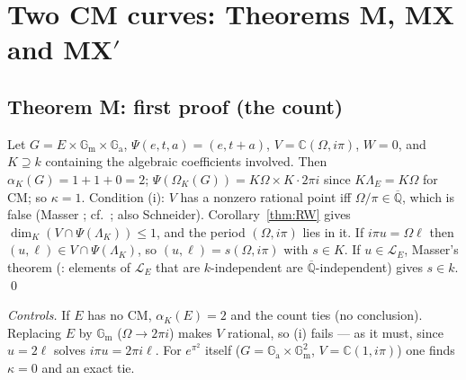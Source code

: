 \documentclass[11pt]{amsart}
\theoremstyle{definition}
\newcommand{\Qb}{\overline{\mathbb{Q}}}
\newcommand{\C}{\mathbb{C}}
\newcommand{\Ga}{\mathbb{G}_{\mathrm a}}
\newcommand{\Gm}{\mathbb{G}_{\mathrm m}}
\newcommand{\Lg}{\mathcal{L}}
\begin{document}
\section{Two CM curves: Theorems M, MX and MX$'$}\label{sec:two}

\subsection{Theorem M: first proof (the count)}\label{sec:M}
Let $G=E\times\Gm\times\Ga$, $\Psi(e,t,a)=(e,t+a)$, $V=\C(\Omega,i\pi)$, $W=0$, and $K\supseteq k$ containing the
algebraic coefficients involved. Then $\alpha_K(G)=1+1+0=2$; $\Psi(\Omega_K(G))=K\Omega\times K\cdot2\pi i$ since
$K\Lambda_E=K\Omega$ for CM; so $\kappa=1$. Condition (i): $V$ has a nonzero rational point iff $\Omega/\pi\in\Qb$, which is
false (Masser \cite{Ma75}; cf.\ \cite[Thm.~26]{W06}; also Schneider). Corollary~\ref{thm:RW} gives
$\dim_K(V\cap\Psi(\Lambda_K))\le1$, and the period $(\Omega,i\pi)$ lies in it. If $i\pi u=\Omega\ell$ then
$(u,\ell)\in V\cap\Psi(\Lambda_K)$, so $(u,\ell)=s(\Omega,i\pi)$ with $s\in K$. If $u\in\Lg_E$, Masser's theorem
(\cite[Thm.~27]{W06}: elements of $\Lg_E$ that are $k$-independent are $\Qb$-independent) gives $s\in k$. \qed

\smallskip\noindent\emph{Controls.} If $E$ has no CM, $\alpha_K(E)=2$ and the count ties (no conclusion). Replacing $E$ by
$\Gm$ ($\Omega\to2\pi i$) makes $V$ rational, so (i) fails --- as it must, since $u=2\ell$ solves $i\pi u=2\pi i\ell$. For
$e^{\pi^2}$ itself ($G=\Ga\times\Gm^2$, $V=\C(1,i\pi)$) one finds $\kappa=0$ and an exact tie.
\end{document}
